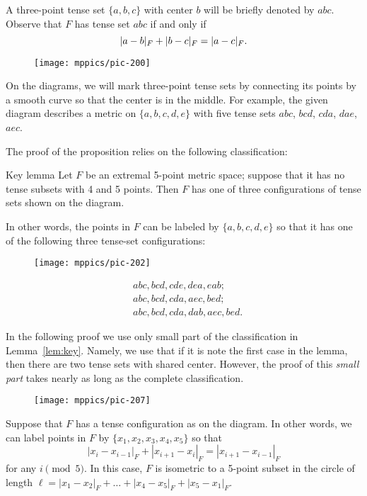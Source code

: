 \documentclass{article}
\begin{document}
A three-point tense set $\{a,b,c\}$ with center $b$ will be briefly denoted by $abc$.
Observe that $F$ has tense set $abc$ if and only if 
\[|a-b|_F+|b-c|_F\z=|a-c|_F.\]

{

\begin{wrapfigure}{r}{20mm}
\vskip-6mm
\centering
\texttt{[image: mppics/pic-200]}
\end{wrapfigure}

On the diagrams, we will mark three-point tense sets by connecting its points by a smooth curve so that the center is in the middle.
For example, the given diagram describes a metric on $\{a,b,c,d,e\}$ with five tense sets $abc$, $bcd$, $cda$, $dae$, $aec$.

}

The proof of the proposition relies on the following classification:

\begin{thm}{Key lemma}\label{lem:key}
Let $F$ be an extremal 5-point metric space; suppose that it has no tense subsets with 4 and 5 points.
Then $F$ has one of three configurations of tense sets shown on the diagram.

In other words, the points in $F$ can be labeled by $\{a,b,c,d,e\}$ so that it has
one of the following three tense-set configurations:

\begin{wrapfigure}{r}{50mm}
\vskip3mm
\centering
\texttt{[image: mppics/pic-202]}
\end{wrapfigure}
\vskip-6mm
\begin{align*}
&abc, bcd, cde, dea, eab;
\\
&abc, bcd, cda, aec, bed;
\\
&abc, bcd, cda, dab, aec, bed.
\end{align*}

\end{thm}

In the following proof we use only small part of the classification in Lemma~\ref{lem:key}.
Namely, we use that if it is note the first case in the lemma, then there are two tense sets with shared center.  
However, the proof of this \emph{small part} takes nearly as long as the complete classification.

\begin{wrapfigure}{r}{20mm}
\vskip-0mm
\centering
\texttt{[image: mppics/pic-207]}
\end{wrapfigure}

Suppose that $F$ has a tense configuration as on the diagram.
In other words, we can label points in $F$  by $\{x_1,x_2,x_3,x_4,x_5\}$ so that
\[|x_{i}-x_{i-1}|_F+|x_{i+1}-x_{i}|_F=|x_{i+1}-x_{i-1}|_F\]
for any $i\pmod 5$.
In this case, $F$ is isometric to a 5-point subset in the circle of length 
$\ell=|x_1-x_2|_F+\dots+|x_4-x_5|_F+|x_5-x_1|_F$.
\end{document}
